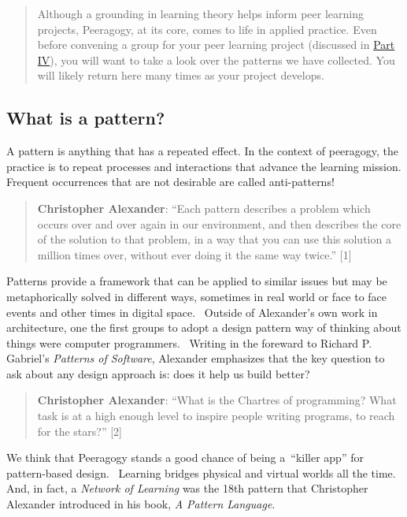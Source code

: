 \begin{quote}
Although a grounding in learning theory helps inform peer learning
projects, Peeragogy, at its core, comes to life in applied practice.
Even before convening a group for your peer learning project (discussed
in \href{http://peeragogy.github.io/convening.html}{Part IV}), you will
want to take a look over the patterns we have collected. You will likely
return here many times as your project develops.
\end{quote}

\subsection{What is a pattern?}\label{what-is-a-pattern}

A pattern is anything that has a repeated effect. In the context of
peeragogy, the practice is to repeat processes and interactions that
advance the learning mission. Frequent occurrences that are not
desirable are called anti-patterns!

\begin{quote}
\textbf{Christopher Alexander}: ``Each pattern describes a problem which
occurs over and over again in our environment, and then describes the
core of the solution to that problem, in a way that you can use this
solution a million times over, without ever doing it the same way
twice.'' {{[}1{]}}
\end{quote}

Patterns provide a framework that can be applied to similar issues but
may be metaphorically solved in different ways, sometimes in real world
or face to face events and other times in digital space.~ Outside of
Alexander's own work in architecture, one the first groups to adopt a
design pattern way of thinking about things were computer programmers.~
Writing in the foreward to Richard P. Gabriel's \emph{Patterns of
Software}, Alexander emphasizes that the key question to ask about any
design approach is: does it help us build better?

\begin{quote}
\textbf{Christopher Alexander}: ``What is the Chartres of programming?
What task is at a high enough level to inspire people writing programs,
to reach for the stars?'' {{[}2{]}}
\end{quote}

We think that Peeragogy stands a good chance of being a~``killer app''
for pattern-based design.~ Learning bridges physical and virtual worlds
all the time.~ And, in fact, a \emph{Network of Learning} was the 18th
pattern that Christopher Alexander introduced in his book, \emph{A
Pattern Language}.

